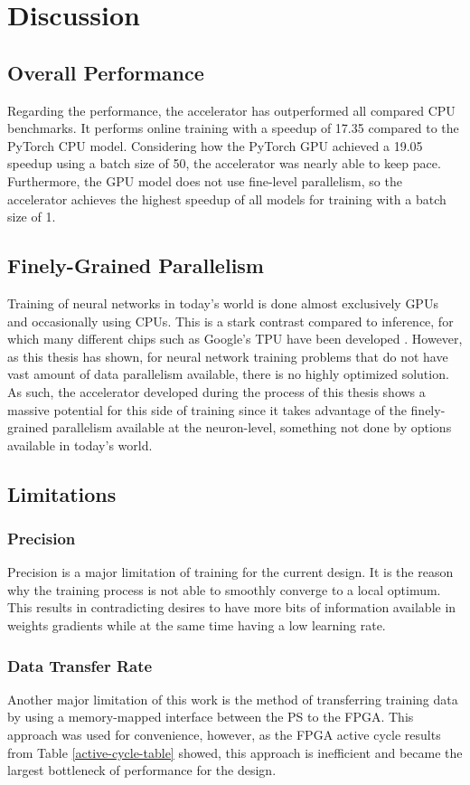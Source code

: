 \chapter{Discussion}
\section{Overall Performance}
Regarding the performance, the accelerator has outperformed all compared CPU benchmarks. It performs online training with a speedup of 17.35 compared to the PyTorch CPU model. Considering how the PyTorch GPU achieved a 19.05 speedup using a batch size of 50, the accelerator was nearly able to keep pace. Furthermore, the GPU model does not use fine-level parallelism, so the accelerator achieves the highest speedup of all models for training with a batch size of 1.

\section{Finely-Grained Parallelism}
Training of neural networks in today's world is done almost exclusively GPUs and occasionally using CPUs. This is a stark contrast compared to inference, for which many different chips such as Google's TPU have been developed \cite{TPU}. However, as this thesis has shown, for neural network training problems that do not have vast amount of data parallelism available, there is no highly optimized solution. As such, the accelerator developed during the process of this thesis shows a massive potential for this side of training since it takes advantage of the finely-grained parallelism available at the neuron-level, something not done by options available in today's world.

\section{Limitations}
\subsection{Precision}
Precision is a major limitation of training for the current design. It is the reason why the training process is not able to smoothly converge to a local optimum. This results in contradicting desires to have more bits of information available in weights gradients while at the same time having a low learning rate.

\subsection{Data Transfer Rate}
Another major limitation of this work is the method of transferring training data by using a memory-mapped interface between the PS to the FPGA. This approach was used for convenience, however, as the FPGA active cycle results from Table \ref{active-cycle-table} showed, this approach is inefficient and became the largest bottleneck of performance for the design.

